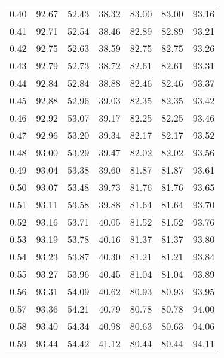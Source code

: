 \begin{tabular}{|c|c|c|c|c|c|c|}
      0.40 &     92.67 &     52.43 &      38.32 &   83.00 &      83.00 &         93.16 \\
      0.41 &     92.71 &     52.54 &      38.46 &   82.89 &      82.89 &         93.21 \\
      0.42 &     92.75 &     52.63 &      38.59 &   82.75 &      82.75 &         93.26 \\
      0.43 &     92.79 &     52.73 &      38.72 &   82.61 &      82.61 &         93.31 \\
      0.44 &     92.84 &     52.84 &      38.88 &   82.46 &      82.46 &         93.37 \\
      0.45 &     92.88 &     52.96 &      39.03 &   82.35 &      82.35 &         93.42 \\
      0.46 &     92.92 &     53.07 &      39.17 &   82.25 &      82.25 &         93.46 \\
      0.47 &     92.96 &     53.20 &      39.34 &   82.17 &      82.17 &         93.52 \\
      0.48 &     93.00 &     53.29 &      39.47 &   82.02 &      82.02 &         93.56 \\
      0.49 &     93.04 &     53.38 &      39.60 &   81.87 &      81.87 &         93.61 \\
      0.50 &     93.07 &     53.48 &      39.73 &   81.76 &      81.76 &         93.65 \\
      0.51 &     93.11 &     53.58 &      39.88 &   81.64 &      81.64 &         93.70 \\
      0.52 &     93.16 &     53.71 &      40.05 &   81.52 &      81.52 &         93.76 \\
      0.53 &     93.19 &     53.78 &      40.16 &   81.37 &      81.37 &         93.80 \\
      0.54 &     93.23 &     53.87 &      40.30 &   81.21 &      81.21 &         93.84 \\
      0.55 &     93.27 &     53.96 &      40.45 &   81.04 &      81.04 &         93.89 \\
      0.56 &     93.31 &     54.09 &      40.62 &   80.93 &      80.93 &         93.95 \\
      0.57 &     93.36 &     54.21 &      40.79 &   80.78 &      80.78 &         94.00 \\
      0.58 &     93.40 &     54.34 &      40.98 &   80.63 &      80.63 &         94.06 \\
      0.59 &     93.44 &     54.42 &      41.12 &   80.44 &      80.44 &         94.11 \\

\end{tabular}
